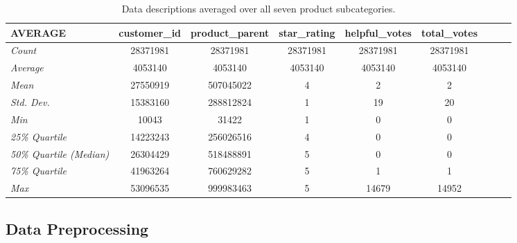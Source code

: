 \documentclass[10pt, conference, compsocconf]{IEEEtran}
\begin{document}
\begin{center}
	\begin{table*}[!]
		\centering \footnotesize
		\vspace{0.01cm}
		\caption{Data descriptions averaged over all seven product subcategories.}
		\hspace{1cm}
		\begin{tabular}{| l | c | c | c | c | c | c | c | c |}
			\hline
			\textbf{AVERAGE} & \textbf{customer\_id}	& \textbf{product\_parent}	& \textbf{star\_rating}	& \textbf{helpful\_votes}& 	\textbf{total\_votes} \\ \hline
			
			\textit{Count} & 28371981 &	28371981 &	28371981 &	28371981 &	28371981 \\ \hline
			\textit{Average} & 4053140 &	4053140 &	4053140 &	4053140 &	4053140  \\ \hline
			\textit{Mean} & 27550919 &	507045022&	4&	2&	2	 \\ \hline
			\textit{Std. Dev.} & 15383160&	288812824&	1	&19	&20	 \\ \hline
			\textit{Min} &10043&	31422&	1&	0&	0	\\ \hline
			\textit{25\% Quartile} & 14223243&	256026516	&4&	0&	0	 \\ \hline
			\textit{50\% Quartile (Median)} & 	26304429&	518488891&	5&	0&	0	 \\ \hline
			\textit{75\% Quartile} & 41963264&	760629282&	5&	1&	1	\\ \hline
			\textit{Max} & 53096535&	999983463&	5&	14679&	14952 \\ \hline
		\end{tabular}\newline
		\vspace{-0.05cm}
		\label{Table1}
	\end{table*} \hfil
\end{center} \vspace{-6mm}

\subsection{Data Preprocessing}
\end{document}
